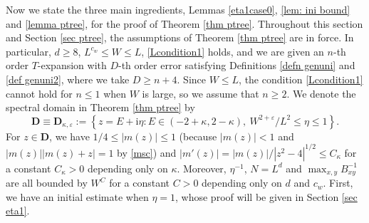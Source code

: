 \documentclass{article}
\newcommand{\1}{\mathds{1}}
\numberwithin{equation}{section}
\newcommand{\be}{\begin{equation}}
\newcommand{\ee}{\end{equation}}
\newcommand{\e}{{\varepsilon}}
\newcommand{\ii}{\mathrm{i}} %
\renewcommand{\leq}{\leqslant}
\renewcommand{\geq}{\geqslant}
\renewcommand{\le}{\leq}
\renewcommand{\ge}{\geq}
\newcommand{\Z}{\mathbb{Z}}
\theoremstyle{plain} %
\theoremstyle{remark}
\newcommand{\cob}{\color{purple}}
\newcommand{\nc}{\normalcolor}
\begin{document}
 
Now we state the three main ingredients, Lemmas \ref{eta1case0}, \ref{lem: ini bound} and \ref{lemma ptree}, for the proof of Theorem  \ref{thm ptree}. Throughout this section and Section \ref{sec ptree}, the assumptions of Theorem \ref{thm ptree} are in force. In particular, $d\ge 8$, $L^{c_w}\le W\le L$, \eqref{Lcondition1} holds, and we are given an $n$-th order $T$-expansion with $D$-th order error satisfying Definitions \ref{defn genuni} and \ref{def genuni2}, where we take $D\ge n+4$. Since $W\le L$, the condition \eqref{Lcondition1} cannot hold for $n\le 1$ when $W$ is large, so we assume that $n\ge 2$. We denote the spectral domain in Theorem \ref{thm ptree} by
$$
\mathbf D\equiv \mathbf D_{\kappa,\e}:=\left\{z=E+\ii\eta: E\in(-2+\kappa,2-\kappa),\ W^{2+\e}/L^2\le \eta\le 1\right\}.
$$
For $z\in \mathbf D$, we have $1/4\le |m(z)|\le 1$ (because $|m(z)|<1$ and $|m(z)||m(z)+z|=1$ by \eqref{msc}) and $|m'(z)|=|m(z)|/|z^2-4|^{1/2}\le C_\kappa$ for a constant $C_\kappa>0$ depending only on $\kappa$. Moreover, $\eta^{-1}$, $N=L^d$ and $\max_{x,y}B_{xy}^{-1}$ are all bounded by $W^C$ for a constant $C>0$ depending only on $d$ and $c_w$. First, we have an initial estimate when $\eta=1$, whose proof will be given in Section \ref{sec eta1}. %
 
\end{document}
